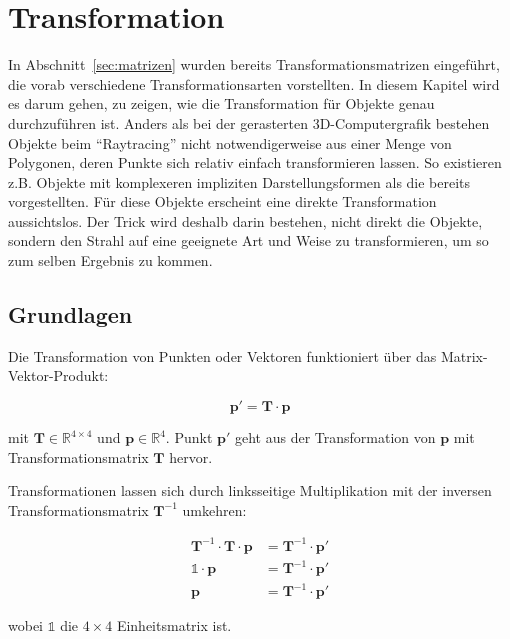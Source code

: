 
\chapter{Transformation} \label{ch:transformation}


In Abschnitt~\ref{sec:matrizen} wurden bereits Transformationsmatrizen eingeführt, die vorab verschiedene Transformationsarten vorstellten.
In diesem Kapitel wird es darum gehen, zu zeigen, wie die Transformation für Objekte genau durchzuführen ist.
Anders als bei der gerasterten 3D-Computergrafik bestehen Objekte beim "`Raytracing"' nicht notwendigerweise aus einer Menge von Polygonen, deren Punkte sich relativ einfach transformieren lassen.
So existieren z.B. Objekte mit komplexeren impliziten Darstellungsformen als die bereits vorgestellten. Für diese Objekte erscheint eine direkte Transformation aussichtslos. Der Trick wird deshalb darin bestehen, nicht direkt die Objekte, sondern den Strahl auf eine geeignete Art und Weise zu transformieren, um so zum selben Ergebnis zu kommen.

\section{Grundlagen }

Die Transformation von Punkten oder Vektoren funktioniert über das Matrix-Vektor-Produkt:

\begin{equation*}
    \boldsymbol{p'} = \boldsymbol{T} \cdot \boldsymbol{p}
\end{equation*}

mit \( \boldsymbol{T} \in \mathds{R}^{4 \times 4} \) und \( \boldsymbol{p} \in \mathds{R}^4 \). Punkt \( \boldsymbol{p'} \) geht aus der Transformation von \( \boldsymbol{p} \) mit Transformationsmatrix \( \boldsymbol{T} \) hervor.

Transformationen lassen sich durch linksseitige Multiplikation mit der inversen Transformationsmatrix \( \boldsymbol{T}^{-1} \) umkehren:

\begin{align*}
    \boldsymbol{T}^{-1} \cdot \boldsymbol{T} \cdot \boldsymbol{p} &= \boldsymbol{T}^{-1} \cdot \boldsymbol{p'}\\
    \mathds{1} \cdot \boldsymbol{p} &= \boldsymbol{T}^{-1} \cdot \boldsymbol{p'}\\
    \boldsymbol{p} &= \boldsymbol{T}^{-1} \cdot \boldsymbol{p'}
\end{align*}

wobei \( \mathds{1} \) die \( 4 \times 4 \) Einheitsmatrix ist.


